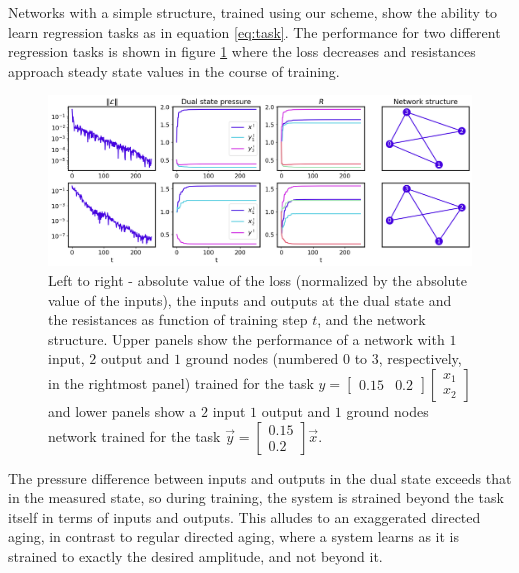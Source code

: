 \documentclass[%
 reprint,
 amsmath,amssymb,
 aps,
]{revtex4-2}
\begin{document}
    Networks with a simple structure, trained using our scheme, show the ability to learn regression tasks as in equation \ref{eq:task}. The performance for two different regression tasks is shown in figure \ref{fig:variabs_in_t} where the loss decreases and resistances approach steady state values in the course of training. 
    \begin{figure}[ht]
    \centerline{
    \includegraphics[width=\textwidth,height=\textheight,keepaspectratio]{Figures/performance_2_examples_4panels_mycolors.png}
    }
    \caption{Left to right - absolute value of the loss (normalized by the absolute value of the inputs), the inputs and outputs at the dual state and the resistances as function of training step $t$, and the network structure. Upper panels show the performance of a network with $1$ input, $2$ output and $1$ ground nodes (numbered $0$ to $3$, respectively, in the rightmost panel) trained for the task $y=\left[\begin{array}{cc}0.15 & 0.2\end{array}\right]\left[\begin{array}{c} x_{1}\\x_{2}\end{array}\right]$ and lower panels show a $2$ input $1$ output and $1$ ground nodes network trained for the task $\vec{y}=\left[\begin{array}{c}0.15\\0.2\end{array}\right]\vec{x}$.}
    \label{fig:variabs_in_t}
    \end{figure}
    The pressure difference between inputs and outputs in the dual state exceeds that in the measured state, so during training, the system is strained beyond the task itself in terms of inputs and outputs. This alludes to an exaggerated directed aging, in contrast to regular directed aging, where a system learns as it is strained to exactly the desired amplitude, and not beyond it.
\end{document}
